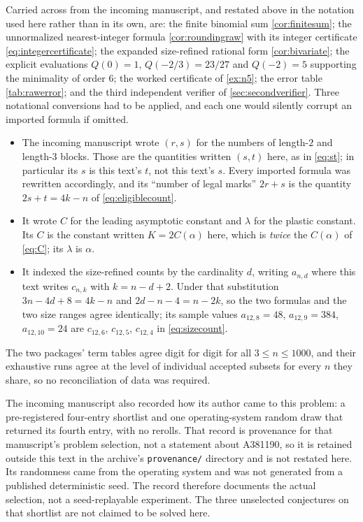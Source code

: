\documentclass[11pt,letterpaper]{article}
\numberwithin{equation}{section}
\theoremstyle{definition}
\newcommand{\1}{\mathbf 1}
\begin{document}
Carried across from the incoming manuscript, and restated above in the
notation used here rather than in its own, are: the finite binomial sum
\cref{cor:finitesum}; the unnormalized nearest-integer formula
\cref{cor:roundingraw} with its integer certificate
\eqref{eq:integercertificate}; the expanded size-refined rational form
\cref{cor:bivariate}; the explicit evaluations $Q(0)=1$, $Q(-2/3)=23/27$ and
$Q(-2)=5$ supporting the minimality of order $6$; the worked certificate of
\cref{ex:n5}; the error table \cref{tab:rawerror}; and the third independent
verifier of \cref{sec:secondverifier}. Three notational conversions had to be
applied, and each one would silently corrupt an imported formula if omitted.
\begin{itemize}[leftmargin=1.6em,itemsep=1pt]
\item The incoming manuscript wrote $(r,s)$ for the numbers of length-$2$ and
 length-$3$ blocks. Those are the quantities written $(s,t)$ here, as in
 \eqref{eq:st}; in particular its $s$ is this text's $t$, not this text's $s$.
 Every imported formula was rewritten accordingly, and its ``number of legal
 marks'' $2r+s$ is the quantity $2s+t=4k-n$ of \eqref{eq:eligiblecount}.
\item It wrote $C$ for the leading asymptotic constant and $\lambda$ for the
 plastic constant. Its $C$ is the constant written $K=2C(\alpha)$ here, which
 is \emph{twice} the $C(\alpha)$ of \eqref{eq:C}; its $\lambda$ is $\alpha$.
\item It indexed the size-refined counts by the cardinality $d$, writing
 $a_{n,d}$ where this text writes $c_{n,k}$ with $k=n-d+2$. Under that
 substitution $3n-4d+8=4k-n$ and $2d-n-4=n-2k$, so the two formulas and the two
 size ranges agree identically; its sample values $a_{12,8}=48$,
 $a_{12,9}=384$, $a_{12,10}=24$ are $c_{12,6}$, $c_{12,5}$, $c_{12,4}$ in
 \eqref{eq:sizecount}.
\end{itemize}
The two packages' term tables agree digit for digit for all $3\le n\le1000$,
and their exhaustive runs agree at the level of individual accepted subsets for
every $n$ they share, so no reconciliation of data was required.

The incoming manuscript also recorded how its author came to this problem: a
pre-registered four-entry shortlist and one operating-system random draw that
returned its fourth entry, with no rerolls. That record is provenance for that
manuscript's problem selection, not a statement about A381190, so it is
retained outside this text in the archive's \texttt{provenance/} directory and
is not restated here. Its randomness came from the operating system and was not
generated from a published deterministic seed. The record therefore documents
the actual selection, not a seed-replayable experiment. The three unselected
conjectures on that shortlist are not claimed to be solved here.
\end{document}
